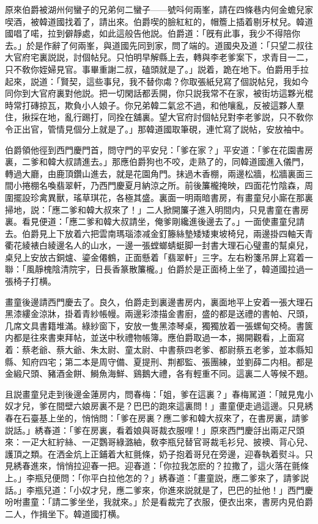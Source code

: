 原來伯爵被湖州何蠻子的兄弟何二蠻子——號呌何兩峯，請在四條巷内何金蟾兒家喫酒，被韓道國找着了，請出來。伯爵喫的臉紅紅的，帽簷上插着剔牙杖兒。韓道國唱了喏，拉到僻靜處，如此這般告他説。伯爵道：「旣有此事，我少不得陪你去。」於是作辭了何兩峯，與道國先同到家，問了端的。道國央及道：「只望二叔往大官府宅裏説説，討個帖兒。只怕明早解縣上去，轉與李老爹案下，求青目一二，只不敎你姪婦見官。事畢重謝二叔，磕頭就是了。」説着，跪在地下。伯爵用手拉起來，説道：「賢契，這些事兒，我不替你䖏？你取張紙兒寫了個説帖兒，我如今同你到大官府裏對他説。把一切閑話都丢開，你只説我常不在家，被街坊這夥光棍時常打磚掠瓦，欺負小人娘子。你兄弟韓二氣忿不過，和他嚷亂，反被這夥人羣住，揪採在地，亂行踢打，同拴在舖裏。望大官府討個帖兒對李老爹説，只不敎你令正出官，管情見個分上就是了。」那韓道國取筆硯，連忙寫了説帖，安放袖中。

伯爵領他徑到西門慶門首，問守門的平安兒：「爹在家？」平安道：「爹在花園書房裏，二爹和韓大叔請進去。」那應伯爵狗也不咬，走熟了的，同韓道國進入儀門，轉過大廳，由鹿頂鑽山進去，就是花園角門。抹過木香棚，兩邊松牆，松牆裏面三間小捲棚名喚翡翠軒，乃西門慶夏月納涼之所。前後簾櫳掩映，四面花竹陰森，周圍擺設珍禽異獸，瑤草琪花，各極其盛。裏面一明兩暗書房，有畫童兒小廝在那裏掃地，説：「應二爹和韓大叔來了！」二人掀開簾子進入明間内，只見書童在書房裏。看見便道：「應二爹和韓大叔請坐，俺爹剛纔進後邊去了。」一面使畫童兒請去。伯爵見上下放着六把雲南瑪瑙漆减金釘籐絲墊矮矮東坡椅兒，兩邊掛四軸天青衢花綾裱白綾邊名人的山水，一邊一張螳螂蜻蜓脚一封書大理石心璧畫的幫桌兒，桌兒上安放古銅爐、鎏金僊鶴，正面懸着「翡翠軒」三字。左右粉箋吊屏上寫着一聯：「風靜槐陰清院宇，日長香篆散簾櫳。」伯爵於是正面椅上坐了，韓道國拉過一張椅子打横。

畫童後邊請西門慶去了。良久，伯爵走到裏邊書房内，裏面地平上安着一張大理石黑漆縷金涼牀，掛着青紗帳幔。兩邊彩漆描金書廚，盛的都是送禮的書帕、尺頭，几席文具書籍堆滿。綠紗窗下，安放一隻黑漆琴桌，獨獨放着一張螺甸交椅。書篋内都是往來書柬拜帖，並送中秋禮物帳簿。應伯爵取過一本，揭開觀看，上面寫着：蔡老爺、蔡大爺、朱太尉、童太尉、中書蔡四老爹、都尉蔡五老爹，並本縣知縣、知府四宅；第二本是周守備、夏提刑、荆都監、張團練，並劉薛二内相。都是金緞尺頭、豬酒金餅、鰣魚海鮮、鷄鵝大禮，各有輕重不同。這裏二人等候不題。

且説畫童兒走到後邊金蓮房内，問春梅：「姐，爹在這裏？」春梅駡道：「賊見鬼小奴才兒，爹在間壁六娘房裏不是？巴巴的跑來這裏問！」畫童便走過這邊。只見綉春在石臺基上坐的，悄悄問：「爹在房裏？應二爹和韓大叔來了，在書房裏，請爹説話。」綉春道：「爹在房裏，看着娘與哥裁衣服哩！」原來西門慶㧱出兩疋尺頭來：一疋大紅紵絲、一疋鸚哥綠潞紬，敎李瓶兒替官哥裁毛衫兒、披襖、背心兒、護頂之類。在洒金炕上正鋪着大紅氈條，奶子抱着哥兒在旁邊，迎春執着熨斗。只見綉春進來，悄悄拉迎春一把。迎春道：「你拉我怎麽的？拉撒了，這火落在氈條上。」李瓶兒便問：「你平白拉他怎的？」綉春道：「畫童説，應二爹來了，請爹説話。」李瓶兒道：「小奴才兒，應二爹來，你進來説就是了，巴巴的扯他！」西門慶吩咐畫童：「請二爹坐坐，我就來。」於是看裁完了衣服，便衣出來，書房内見伯爵二人，作揖坐下。韓道國打横。


